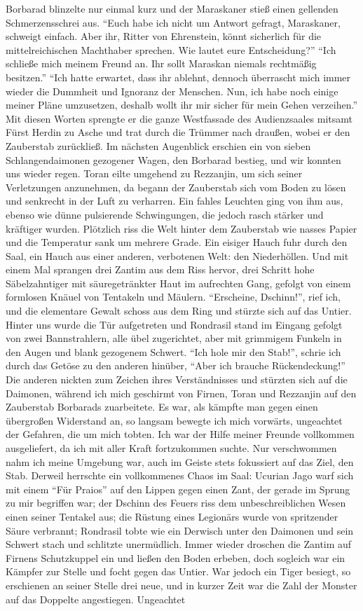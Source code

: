 Borbarad blinzelte nur einmal kurz und der Maraskaner stieß einen gellenden Schmerzensschrei aus. ``Euch habe ich nicht um Antwort gefragt, Maraskaner, schweigt einfach. Aber ihr, Ritter von Ehrenstein, könnt sicherlich für die mittelreichischen Machthaber sprechen. Wie lautet eure Entscheidung?'' ``Ich schließe mich meinem Freund an. Ihr sollt Maraskan niemals rechtmäßig besitzen.'' ``Ich hatte erwartet, dass ihr ablehnt, dennoch überrascht mich immer wieder die Dummheit und Ignoranz der Menschen. Nun, ich habe noch einige meiner Pläne umzusetzen, deshalb wollt ihr mir sicher für mein Gehen verzeihen.'' Mit diesen Worten sprengte er die ganze Westfassade des Audienzsaales mitsamt Fürst Herdin zu Asche und trat durch die Trümmer nach draußen, wobei er den Zauberstab zurückließ. Im nächsten Augenblick erschien ein von sieben Schlangendaimonen gezogener Wagen, den Borbarad bestieg, und wir konnten uns wieder regen. Toran eilte umgehend zu Rezzanjin, um sich seiner Verletzungen anzunehmen, da begann der Zauberstab sich vom Boden zu lösen und senkrecht in der Luft zu verharren. Ein fahles Leuchten ging von ihm aus, ebenso wie dünne pulsierende Schwingungen, die jedoch rasch stärker und kräftiger wurden. Plötzlich riss die Welt hinter dem Zauberstab wie nasses Papier und die Temperatur sank um mehrere Grade. Ein eisiger Hauch fuhr durch den Saal, ein Hauch aus einer anderen, verbotenen Welt: den Niederhöllen. Und mit einem Mal sprangen drei Zantim aus dem Riss hervor, drei Schritt hohe Säbelzahntiger mit säuregetränkter Haut im aufrechten Gang, gefolgt von einem formlosen Knäuel von Tentakeln und Mäulern. ``Erscheine, Dschinn!'', rief ich, und die elementare Gewalt schoss aus dem Ring und stürzte sich auf das Untier. Hinter uns wurde die Tür aufgetreten und Rondrasil stand im Eingang gefolgt von zwei Bannstrahlern, alle übel zugerichtet, aber mit grimmigem Funkeln in den Augen und blank gezogenem Schwert. ``Ich hole mir den Stab!'', schrie ich durch das Getöse zu den anderen hinüber, ``Aber ich brauche Rückendeckung!'' Die anderen nickten zum Zeichen ihres Verständnisses und stürzten sich auf die Daimonen, während ich mich geschirmt von Firnen, Toran und Rezzanjin auf den Zauberstab Borbarads zuarbeitete. Es war, als kämpfte man gegen einen übergroßen Widerstand an, so langsam bewegte ich mich vorwärts, ungeachtet der Gefahren, die um mich tobten. Ich war der Hilfe meiner Freunde vollkommen ausgeliefert, da ich mit aller Kraft fortzukommen suchte. Nur verschwommen nahm ich meine Umgebung war, auch im Geiste stets fokussiert auf das Ziel, den Stab. Derweil herrschte ein vollkommenes Chaos im Saal: Ucurian Jago warf sich mit einem ``Für Praios'' auf den Lippen gegen einen Zant, der gerade im Sprung zu mir begriffen war; der Dschinn des Feuers riss dem unbeschreiblichen Wesen einen seiner Tentakel aus; die Rüstung eines Legionärs wurde von spritzender Säure verbrannt; Rondrasil tobte wie ein Derwisch unter den Daimonen und sein Schwert stach und schlitzte unermüdlich. Immer wieder droschen die Zantim auf Firnens Schutzkuppel ein und ließen den Boden erbeben, doch sogleich war ein Kämpfer zur Stelle und focht gegen das Untier. War jedoch ein Tiger besiegt, so erschienen an seiner Stelle drei neue, und in kurzer Zeit war die Zahl der Monster auf das Doppelte angestiegen. Ungeachtet 